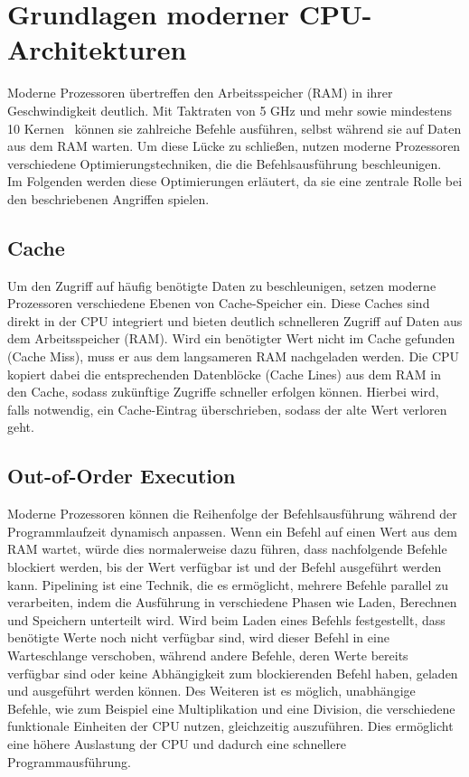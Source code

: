 \section{Grundlagen moderner CPU-Architekturen}
\label{sec:grundlagen-moderner-cpu-architekturen}
Moderne Prozessoren übertreffen den Arbeitsspeicher (RAM) in ihrer Geschwindigkeit deutlich.
Mit Taktraten von 5 GHz und mehr sowie mindestens 10 Kernen~\cite{ryzen_9} können sie zahlreiche Befehle ausführen, selbst während sie auf Daten aus dem RAM warten.
Um diese Lücke zu schließen, nutzen moderne Prozessoren verschiedene Optimierungstechniken, die die Befehlsausführung beschleunigen. \\
Im Folgenden werden diese Optimierungen erläutert, da sie eine zentrale Rolle bei den beschriebenen Angriffen spielen.

\subsection{Cache}
\label{subsec:cache}
Um den Zugriff auf häufig benötigte Daten zu beschleunigen, setzen moderne Prozessoren verschiedene Ebenen von Cache-Speicher ein.
Diese Caches sind direkt in der CPU integriert und bieten deutlich schnelleren Zugriff auf Daten aus dem Arbeitsspeicher (RAM).
Wird ein benötigter Wert nicht im Cache gefunden (Cache Miss), muss er aus dem langsameren RAM nachgeladen werden.
Die CPU kopiert dabei die entsprechenden Datenblöcke (Cache Lines) aus dem RAM in den Cache, sodass zukünftige Zugriffe schneller erfolgen können.
Hierbei wird, falls notwendig, ein Cache-Eintrag überschrieben, sodass der alte Wert verloren geht.

\subsection{Out-of-Order Execution}
\label{subsec:out-of-order-execution}
Moderne Prozessoren können die Reihenfolge der Befehlsausführung während der Programmlaufzeit dynamisch anpassen.
Wenn ein Befehl auf einen Wert aus dem RAM wartet, würde dies normalerweise dazu führen, dass nachfolgende Befehle blockiert werden, bis der Wert verfügbar ist und der Befehl ausgeführt werden kann.
Pipelining ist eine Technik, die es ermöglicht, mehrere Befehle parallel zu verarbeiten, indem die Ausführung in verschiedene Phasen wie Laden, Berechnen und Speichern unterteilt wird.
Wird beim Laden eines Befehls festgestellt, dass benötigte Werte noch nicht verfügbar sind, wird dieser Befehl in eine Warteschlange verschoben, während andere Befehle, deren Werte bereits verfügbar sind oder keine Abhängigkeit zum blockierenden Befehl haben, geladen und ausgeführt werden können.
Des Weiteren ist es möglich, unabhängige Befehle, wie zum Beispiel eine Multiplikation und eine Division, die verschiedene funktionale Einheiten der CPU nutzen, gleichzeitig auszuführen.
Dies ermöglicht eine höhere Auslastung der CPU und dadurch eine schnellere Programmausführung.

